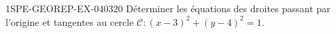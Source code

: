 \begin{exercice}{1SPE-GEOREP-EX-040}{3}{20}
Déterminer les équations des droites passant par l'origine et tangentes au cercle $\mathcal{C} : (x-3)^2 + (y-4)^2 = 1$.
\end{exercice}
